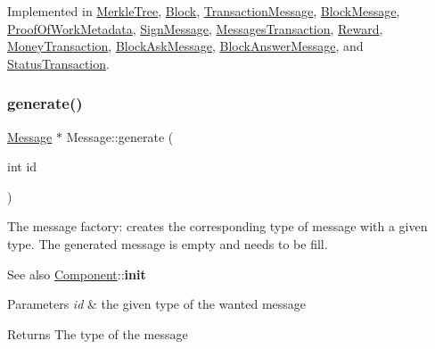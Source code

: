 Implemented in \mbox{\hyperlink{classMerkleTree_a083ad348bfd770f2400f190112ff39a3}{Merkle\+Tree}}, \mbox{\hyperlink{classBlock_ab21c6536cf7a26fdf2a2e889a84fcb9d}{Block}}, \mbox{\hyperlink{classTransactionMessage_a2fbe322d67154d3bcbcc44943eeeb1ef}{Transaction\+Message}}, \mbox{\hyperlink{classBlockMessage_adda957e60057d72e1bc55d7b9c617188}{Block\+Message}}, \mbox{\hyperlink{classProofOfWorkMetadata_afac533eee3123bce72615ab90f7c9669}{Proof\+Of\+Work\+Metadata}}, \mbox{\hyperlink{classSignMessage_a35855647925ec76036ed4602743ed118}{Sign\+Message}}, \mbox{\hyperlink{classMessagesTransaction_aa70ed75ff16f6afa61d82458488069d4}{Messages\+Transaction}}, \mbox{\hyperlink{classReward_a6d16e21b60b7f11c7aaf0098a53118a2}{Reward}}, \mbox{\hyperlink{classMoneyTransaction_a6f4672dba3a75e2782d15366d9ed7a1e}{Money\+Transaction}}, \mbox{\hyperlink{classBlockAskMessage_a25875b2446d7ecc5f644c568c8f12df3}{Block\+Ask\+Message}}, \mbox{\hyperlink{classBlockAnswerMessage_affa76e8a95365baf5c9eb409a0a19b9d}{Block\+Answer\+Message}}, and \mbox{\hyperlink{classStatusTransaction_aa05e4be5f990e8a9533383b3b7dc1382}{Status\+Transaction}}.

\mbox{\label{classMessage_ad92a0e1cfa5b5a503ec9c61833e3e5ea}} 
\subsubsection{\texorpdfstring{generate()}{generate()}}
{\footnotesize\ttfamily \mbox{\hyperlink{classMessage}{Message}} $\ast$ Message\+::generate (\begin{DoxyParamCaption}\item[{int}]{id }\end{DoxyParamCaption})\hspace{0.3cm}{\ttfamily [static]}}

The message factory\+: creates the corresponding type of message with a given type. The generated message is empty and needs to be fill. \begin{DoxySeeAlso}{See also}
\mbox{\hyperlink{classComponent}{Component}}\+:\+:{\bfseries init}
\end{DoxySeeAlso}

\begin{DoxyParams}{Parameters}
{\em id} & the given type of the wanted message \\
\hline
\end{DoxyParams}
\begin{DoxyReturn}{Returns}
The type of the message 
\end{DoxyReturn}
\mbox{\label{classMessage_a2a576dcffd45c4574fcdf2897ec26086}} 
